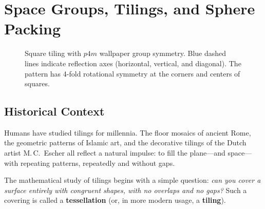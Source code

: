 
\chapter{Space Groups, Tilings, and Sphere Packing}

\begin{figure}[htbp]
\centering
{}
\caption{Square tiling with $p4m$ wallpaper group symmetry. Blue dashed lines indicate reflection axes (horizontal, vertical, and diagonal). The pattern has 4-fold rotational symmetry at the corners and centers of squares.}
\label{fig:p4m}
\end{figure}

\section{Historical Context}

Humans have studied tilings for millennia. The floor mosaics of ancient Rome, the geometric patterns of Islamic art, and the decorative tilings of the Dutch artist M.\,C.\ Escher all reflect a natural impulse: to fill the plane---and space---with repeating patterns, repeatedly and without gaps.

The mathematical study of tilings begins with a simple question: \emph{can you cover a surface entirely with congruent shapes, with no overlaps and no gaps?} Such a covering is called a \textbf{tessellation} (or, in more modern usage, a \textbf{tiling}).

